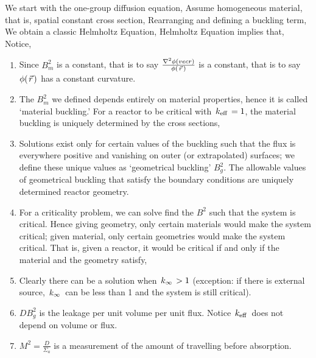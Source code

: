 \documentclass{school-22.211-notes}
\date{March 19, 2012}
\begin{document}
\maketitle

We start with the one-group diffusion equation,
Assume homogeneous material, that is, spatial constant cross section,
Rearranging and defining a buckling term, 
We obtain a classic Helmholtz Equation,
Helmholtz Equation implies that,
Notice,
\begin{enumerate}
\item Since $B_m^2$ is a constant, that is to say $\frac{\nabla^2 \phi(vecr)}{\phi(\left.\vec{r}\right.)}$ is a constant, that is to say $\phi(\left.\vec{r}\right.)$ has a constant curvature. 
\item The $B_m^2$ we defined depends entirely on material properties, hence it is called `material buckling.' For a reactor to be critical with $\left. k_{\mathrm{eff}} \right. = 1$, the material buckling is uniquely determined by the cross sections, 
\item Solutions exist only for certain values of the buckling such that the flux is everywhere positive and vanishing on outer (or extrapolated) surfaces; we define these unique values as `geometrical buckling' $B_g^2$. The allowable values of geometrical buckling that satisfy the boundary conditions are uniquely determined reactor geometry.
\item For a criticality problem, we can solve find the $B^2$ such that the system is critical. Hence giving geometry, only certain materials would make the system critical; given material, only certain geometries would make the system critical. That is, given a reactor, it would be critical if and only if the material and the geometry satisfy,
\item Clearly there can be a solution when $\left. k_{\infty} \right. > 1$ (exception: if there is external source, $\left. k_{\infty} \right.$ can be less than 1 and the system is still critical). 
\item $DB^2_g$ is the leakage per unit volume per unit flux. Notice $\left. k_{\mathrm{eff}} \right.$ does not depend on volume or flux. 
\item {} $M^2 = \frac{D}{\Sigma_a}$ is a measurement of the amount of travelling before absorption. 
\end{enumerate}
\end{document}
